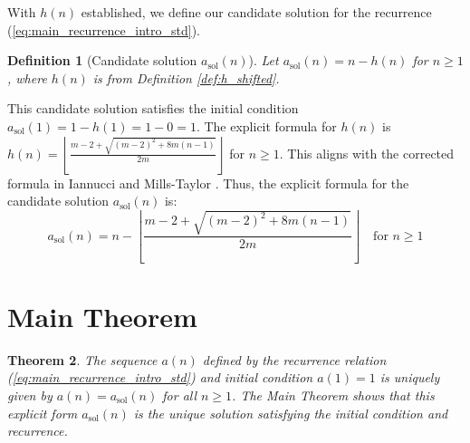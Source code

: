 \documentclass[11pt,a4paper]{article} %
\newtheorem{theorem}{Theorem}[section] %
\newtheorem{definition}[theorem]{Definition}
\theoremstyle{remark}
\newcommand{\floor}[1]{\left\lfloor #1 \right\rfloor} %
\begin{document}
With $h(n)$ established, we define our candidate solution for the recurrence (\ref{eq:main_recurrence_intro_std}).
\begin{definition}[Candidate solution $a_{\text{sol}}(n)$] \label{def:a_candidate}
Let $a_{\text{sol}}(n) = n - h(n)$ for $n \ge 1$, where $h(n)$ is from Definition \ref{def:h_shifted}.
\end{definition}
This candidate solution satisfies the initial condition $a_{\text{sol}}(1) = 1 - h(1) = 1-0=1$.
The explicit formula for $h(n)$ is $h(n) = \floor{\frac{m-2+\sqrt{(m-2)^2+8m(n-1)}}{2m}}$ for $n \ge 1$. This aligns with the corrected formula in Iannucci and Mills-Taylor \cite{Iannucci1999errata}.
Thus, the explicit formula for the candidate solution $a_{\text{sol}}(n)$ is:
\begin{equation} \label{eq:asol_explicit}
a_{\text{sol}}(n) = n - \floor{\frac{m-2+\sqrt{(m-2)^2+8m(n-1)}}{2m}} \quad \text{for } n \ge 1
\end{equation}

\section{Main Theorem} \label{sec:main_theorem_statement}
\begin{theorem} \label{thm:main_article}
The sequence $a(n)$ defined by the recurrence relation (\ref{eq:main_recurrence_intro_std}) and initial condition $a(1)=1$ is uniquely given by $a(n) = a_{\text{sol}}(n)$ for all $n \ge 1$. The Main Theorem shows that this explicit form $a_{\text{sol}}(n)$ is the unique solution satisfying the initial condition and recurrence.
\end{theorem}
\end{document}
